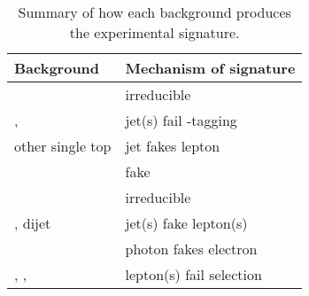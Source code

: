 \begin{table}
	\begin{tabular}{l@{\hskip 0.3in}l}
		\toprule
		Background        & Mechanism of \HepProcess{\Plepton\Plepton + \met} signature \\
		\midrule
		\WW               & irreducible \\
		\ttbar, \HepProcess{\PW \Ptop} & jet(s) fail \Pbottom-tagging \\
		other single top  & jet fakes lepton \\
		\DYll             & fake \met \\
		\DYtt             & irreducible \\
		\Wjets, dijet    & jet(s) fake lepton(s) \\
		\Wgamma           & photon fakes electron \\
		\WZ, \Wgstar, \ZZ & lepton(s) fail selection \\
		\bottomrule
	\end{tabular}
	\caption{Summary of how each background produces the 
	\HepProcess{\Plepton\Plepton + \met} experimental signature.}
	\label{tab:bkg_summary}
\end{table}
